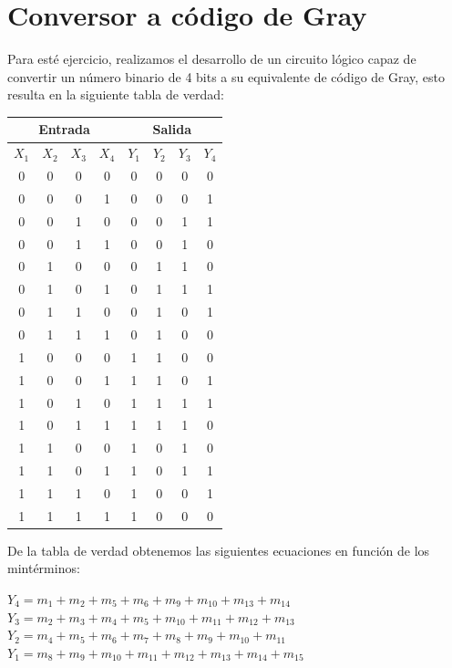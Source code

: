 \section{Conversor a código de Gray}
Para esté ejercicio, realizamos el desarrollo de un circuito lógico capaz de convertir un número binario de 4 bits a su equivalente de código de Gray, esto resulta en la siguiente tabla de verdad:
\begin{table}[H]
	\begin{center}
		\begin{tabular}{|c|c|c|c||c|c|c|c|}
			\hline
			\multicolumn{4}{|c||}{Entrada} & \multicolumn{4}{|c|}{Salida}\\
			\hline
			$X_1$ &	$X_2$ &	$X_3$ &	$X_4$ & $Y_1$ & $Y_2$ & $Y_3$ & $Y_4$\\
			\hline
			0 & 0 & 0 & 0 & 0 & 0 & 0 & 0\\
			\hline
			0 & 0 & 0 & 1 & 0 & 0 & 0 & 1\\
			\hline
			0 & 0 & 1 & 0 & 0 & 0 & 1 & 1\\
			\hline
			0 & 0 & 1 & 1 & 0 & 0 & 1 & 0\\
			\hline
			0 & 1 & 0 & 0 & 0 & 1 & 1 & 0\\
			\hline
			0 & 1 & 0 & 1 & 0 & 1 & 1 & 1\\
			\hline
			0 & 1 & 1 & 0 & 0 & 1 & 0 & 1\\
			\hline
			0 & 1 & 1 & 1 & 0 & 1 & 0 & 0\\
			\hline
			1 & 0 & 0 & 0 & 1 & 1 & 0 & 0\\
			\hline
			1 & 0 & 0 & 1 & 1 & 1 & 0 & 1\\
			\hline
			1 & 0 & 1 & 0 & 1 & 1 & 1 & 1\\
			\hline
			1 & 0 & 1 & 1 & 1 & 1 & 1 & 0\\
			\hline
			1 & 1 & 0 & 0 & 1 & 0 & 1 & 0\\
			\hline
			1 & 1 & 0 & 1 & 1 & 0 & 1 & 1\\
			\hline
			1 & 1 & 1 & 0 & 1 & 0 & 0 & 1\\
			\hline
			1 & 1 & 1 & 1 & 1 & 0 & 0 & 0\\
			\hline
		\end{tabular}
	\end{center}
\end{table}
De la tabla de verdad obtenemos las siguientes ecuaciones en función de los mintérminos:
\begin{center}
	$Y_4=m_1+m_2+m_5+m_6+m_9+m_{10}+m_{13}+m_{14}$\\
	$Y_3=m_2+m_3+m_4+m_5+m_{10}+m_{11}+m_{12}+m_{13}$\\
	$Y_2=m_4+m_5+m_6+m_7+m_8+m_9+m_{10}+m_{11}$\\
	$Y_1=m_8+m_9+m_{10}+m_{11}+m_{12}+m_{13}+m_{14}+m_{15}$\\
\end{center}
